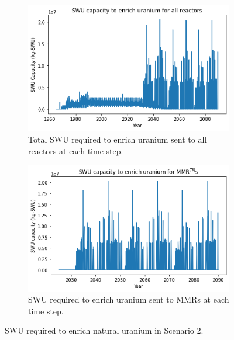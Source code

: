 \documentclass[preprint]{elsarticle}
\providecommand{\DIFaddbeginFL}{} %
\providecommand{\DIFaddendFL}{} %
\providecommand{\DIFdelbeginFL}{} %
\providecommand{\DIFdelendFL}{} %
\begin{document}
\begin{figure}
    \centering
    \begin{subfigure}{0.5\textwidth}
        \centering
        \DIFdelbeginFL %
\DIFdelendFL \DIFaddbeginFL \includegraphics[scale=0.5]{../figures/totalswu_scenarios_2.png}
        \DIFaddendFL \caption{Total \gls{SWU} required to enrich uranium sent to all reactors at each time step.}
        \label{fig:totalswu_2}
    \end{subfigure}
    \hspace{0.8cm}
    \begin{subfigure}{0.5\textwidth}
        \centering
        \DIFdelbeginFL %
\DIFdelendFL \DIFaddbeginFL \includegraphics[scale=0.5]{../figures/haleuSWU_scenarios_2.png}
        \DIFaddendFL \caption{\gls{SWU} required to enrich uranium sent to \glspl{MMR} at each time step.}
        \label{fig:haleuswu_2}
    \end{subfigure}
    \caption{\gls{SWU} required to enrich natural uranium in Scenario 2.}
    \label{fig:swu_2}
\end{figure}
\end{document}

